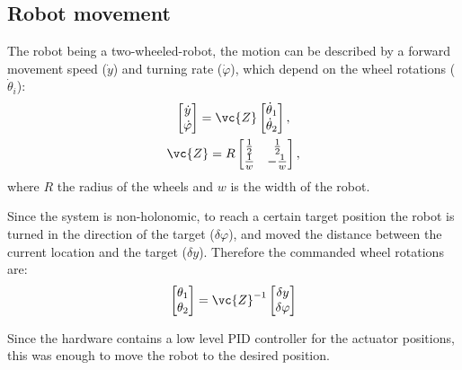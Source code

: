 \subsection{Robot movement}

	The robot being a two-wheeled-robot, the motion can be described by a forward movement speed ($\dot{y}$) and turning rate ($\dot{\varphi}$), which depend on the wheel rotations ($\dot{\theta}_i$):
	\begin{gather}
	\begin{bmatrix}
		\dot{y}\\\dot{\varphi}
	\end{bmatrix}=\vc{Z}
	\begin{bmatrix}
		\dot{\theta}_1\\			
		\dot{\theta}_2
	\end{bmatrix},\\
	\vc{Z}=R
	\begin{bmatrix}
		\frac{1}{2} & \frac{1}{2}\\ \frac{1}{w} & -\frac{1}{w}
	\end{bmatrix},
	\end{gather}
	where $R$ the radius of the wheels and $w$ is the width of the robot.
	
	Since the system is non-holonomic, to reach a certain target position the robot is turned in the direction of the target ($\delta\varphi$), and moved the distance between the current location and the target ($\delta y$). Therefore the commanded wheel rotations are:
	\begin{gather}
		\begin{bmatrix}
			\theta_1\\			
			\theta_2
		\end{bmatrix}=\vc{Z}^{-1}
		\begin{bmatrix}
			\delta y\\\delta \varphi
		\end{bmatrix}
	\end{gather}
	
	Since the hardware contains a low level PID controller for the actuator positions, this was enough to move the robot to the desired position.
		